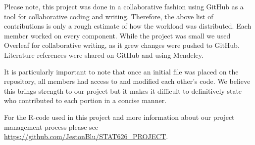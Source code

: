 \documentclass[twoside,twocolumn]{article}
\begin{document}
Please note, this project was done in a collaborative fashion using GitHub as a tool for collaborative coding and writing. Therefore, the above list of contributions is only a rough estimate of how the workload was distributed. Each member worked on every component.  While the project was small we used Overleaf for collaborative writing, as it grew changes were pushed to GitHub.  Literature references were shared on GitHub and using Mendeley.

It is particularly important to note that once an initial file was placed on the repository, all members had access to and modified each other's code. We believe this brings strength to our project but it makes it difficult to definitively state who contributed to each portion in a concise manner.

For  the R-code used in this project and more information about our project management process please see \url{https://github.com/JestonBlu/STAT626_PROJECT}.
\end{document}
